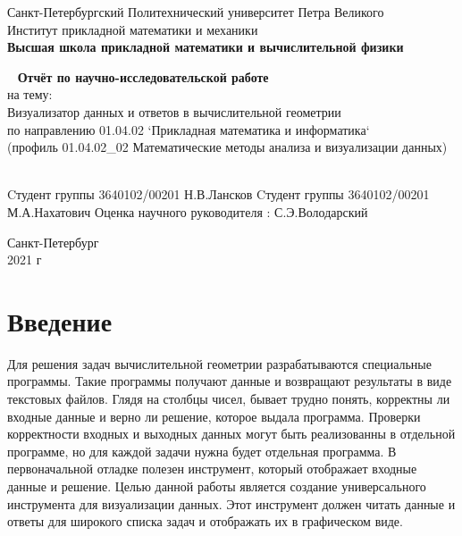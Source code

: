 \documentclass[12pt]{article}
\renewcommand{\listoftables}{\begingroup  %
\tocsection
\tocfile{\listtablename}{lot}
\endgroup}
\begin{document}
\begin{titlepage}
	\center
		Санкт-Петербургский Политехнический университет Петра Великого\\
		Институт прикладной математики и механики
		\\ \textbf{Высшая школа прикладной математики и вычислительной физики}

	\vfill ~
	\textbf{ \large Отчёт по научно-исследовательской работе } \\
    \large на тему: \\
	\large Визуализатор данных и ответов в вычислительной геометрии \\
	\large по направлению 01.04.02 `Прикладная математика и информатика` \\
	\large (профиль 01.04.02\_02 Математические методы анализа и визуализации данных) \\
	\vfill ~
	
    \begin{flushright}
    Cтудент группы 3640102/00201 \underline{\hspace{3cm}} Н.В.Лансков \linebreak[2]
    Cтудент группы 3640102/00201 \underline{\hspace{3cm}} М.А.Нахатович \linebreak[2]
	Оценка научного руководителя : \underline{\hspace{1cm}}\hspace{0.1cm} \underline{\hspace{3cm}} С.Э.Володарский\\  
    \end{flushright}

    
    
\vfill

{\large}Санкт-Петербург
\\ 2021 г
\end{titlepage}


\tableofcontents
\pagebreak

\section{Введение}

Для решения задач вычислительной геометрии разрабатываются специальные программы. Такие программы получают данные и возвращают результаты в виде текстовых файлов. Глядя на столбцы чисел, бывает трудно понять, корректны ли входные данные и верно ли решение, которое выдала программа.
Проверки корректности входных и выходных данных могут быть реализованны в отдельной программе, 
но для каждой задачи нужна будет отдельная программа. В первоначальной отладке полезен инструмент, который отображает входные данные и решение. Целью данной работы является создание универсального инструмента для визуализации данных. Этот инструмент должен читать данные и ответы для широкого списка задач и отображать их в графическом виде.
\end{document}
